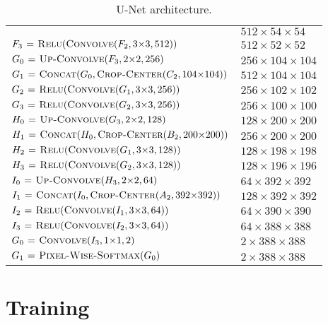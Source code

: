 \documentclass[10pt]{article}
\begin{document}
\begin{itemize}
\begin{table}
\begin{tabular}{l|l}
  	& $512 \times 54 \times 54$ \\
  	$F_3 \mathrel{\hspace{1pt}=\hspace{1pt}} \textnormal{\scshape Relu}(\textnormal{\scshape Convolve}(F_2, 3{\times}3, 512))$ 
  	& $512 \times 52 \times 52$ \\
  	\hline
  	$G_0 \mathrel{\hspace{1pt}=\hspace{1pt}} \textnormal{\scshape Up-Convolve}(F_3, 2{\times}2, 256)$
  	& $256 \times 104 \times 104$ \\
  	$G_1 \mathrel{\hspace{1pt}=\hspace{1pt}} \textnormal{\scshape Concat}(G_0, \textnormal{\scshape Crop-Center}(C_2, 104{\times}104))$
  	& $512 \times 104 \times 104$ \\
  	$G_2 \mathrel{\hspace{1pt}=\hspace{1pt}} \textnormal{\scshape Relu}(\textnormal{\scshape Convolve}(G_1, 3{\times}3, 256))$ 
  	& $256 \times 102 \times 102$ \\
  	$G_3 \mathrel{\hspace{1pt}=\hspace{1pt}} \textnormal{\scshape Relu}(\textnormal{\scshape Convolve}(G_2, 3{\times}3, 256))$ 
  	& $256 \times 100 \times 100$ \\
  	\hline
  	$H_0 \mathrel{\hspace{1pt}=\hspace{1pt}} \textnormal{\scshape Up-Convolve}(G_3, 2{\times}2, 128)$
  	& $128 \times 200 \times 200$ \\
  	$H_1 \mathrel{\hspace{1pt}=\hspace{1pt}} \textnormal{\scshape Concat}(H_0, \textnormal{\scshape Crop-Center}(B_2, 200{\times}200))$
  	& $256 \times 200 \times 200$ \\
  	$H_2 \mathrel{\hspace{1pt}=\hspace{1pt}} \textnormal{\scshape Relu}(\textnormal{\scshape Convolve}(G_1, 3{\times}3, 128))$ 
  	& $128 \times 198 \times 198$ \\
  	$H_3 \mathrel{\hspace{1pt}=\hspace{1pt}} \textnormal{\scshape Relu}(\textnormal{\scshape Convolve}(G_2, 3{\times}3, 128))$ 
  	& $128 \times 196 \times 196$ \\
  	\hline
  	$I_0 \mathrel{\hspace{1pt}=\hspace{1pt}} \textnormal{\scshape Up-Convolve}(H_3, 2{\times}2, 64)$
  	& $64 \times 392 \times 392$ \\
  	$I_1 \mathrel{\hspace{1pt}=\hspace{1pt}} \textnormal{\scshape Concat}(I_0, \textnormal{\scshape Crop-Center}(A_2, 392{\times}392))$
  	& $128 \times 392 \times 392$ \\
  	$I_2 \mathrel{\hspace{1pt}=\hspace{1pt}} \textnormal{\scshape Relu}(\textnormal{\scshape Convolve}(I_1, 3{\times}3, 64))$ 
  	& $64 \times 390 \times 390$ \\
  	$I_3 \mathrel{\hspace{1pt}=\hspace{1pt}} \textnormal{\scshape Relu}(\textnormal{\scshape Convolve}(I_2, 3{\times}3, 64))$ 
  	& $64 \times 388 \times 388$ \\
  	\hline \hline
  	$G_0 \mathrel{\hspace{1pt}=\hspace{1pt}} \textnormal{\scshape Convolve}(I_3, 1{\times}1, 2)$ 
  	& $2 \times 388 \times 388$ \\
  	$G_1 \mathrel{\hspace{1pt}=\hspace{1pt}} \textnormal{\scshape Pixel-Wise-Softmax}(G_0)$ 
  	& $2 \times 388 \times 388$
  	\end{tabular}
  	\caption{U-Net architecture.}
  	\label{unet-architecture}
  	\end{table}  
  \end{itemize}

  \section{Training}
\end{document}
